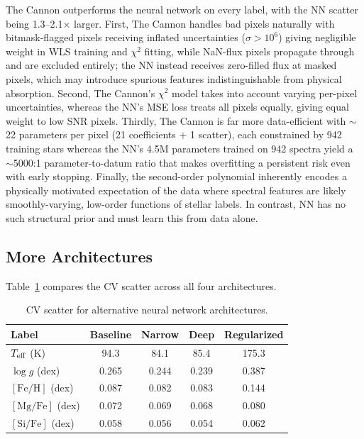 \documentclass[10pt,preprint2]{aastex}
\begin{document}
The Cannon outperforms the neural network on every label, with the NN scatter being 1.3--2.1$\times$ larger. First, The Cannon handles bad pixels naturally with bitmask-flagged pixels receiving inflated uncertainties ($\sigma > 10^6$) giving negligible weight in WLS training and $\chi^2$ fitting, while NaN-flux pixels propagate through and are excluded entirely; the NN instead receives zero-filled flux at masked pixels, which may introduce spurious features indistinguishable from physical absorption. Second, The Cannon's $\chi^2$ model takes into account varying per-pixel uncertainties, whereas the NN's MSE loss treats all pixels equally, giving equal weight to low SNR pixels. Thirdly, The Cannon is far more data-efficient with $\sim$22 parameters per pixel (21 coefficients + 1 scatter), each constrained by 942 training stars whereas the NN's 4.5M parameters trained on 942 spectra yield a $\sim$5000:1 parameter-to-datum ratio that makes overfitting a persistent risk even with early stopping. Finally, the second-order polynomial inherently encodes a physically motivated expectation of the data where spectral features are likely smoothly-varying, low-order functions of stellar labels. In contrast, NN has no such structural prior and must learn this from data alone.

\subsection{More Architectures}

Table~\ref{tab:nn_architectures} compares the CV scatter across all four architectures.

\begin{table}[ht!]
\centering
\caption{CV scatter for alternative neural network architectures.\label{tab:nn_architectures}}
\begin{tabular}{lcccc}
\toprule
Label & Baseline & Narrow & Deep & Regularized \\
\midrule
$T_{\rm eff}$ (K)        & 94.3 & 84.1 & 85.4 & 175.3 \\
$\log g$ (dex)            & 0.265 & 0.244 & 0.239 & 0.387 \\
$[\mathrm{Fe/H}]$ (dex)  & 0.087 & 0.082 & 0.083 & 0.144 \\
$[\mathrm{Mg/Fe}]$ (dex) & 0.072 & 0.069 & 0.068 & 0.080 \\
$[\mathrm{Si/Fe}]$ (dex) & 0.058 & 0.056 & 0.054 & 0.062 \\
\bottomrule
\end{tabular}
\end{table}
\end{document}

